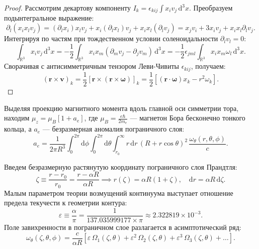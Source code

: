 \documentclass[11pt,a4paper]{article}
\theoremstyle{definition}
\theoremstyle{remark}
\begin{document}
\begin{proof}
Рассмотрим декартову компоненту $I_k = \epsilon_{kij} \int x_i v_j \, \mathrm{d}^3 x$. Преобразуем подынтегральное выражение:
\begin{equation}
    \partial_l (x_i x_l v_j) = (\partial_l x_i) x_l v_j + x_i (\partial_l x_l) v_j + x_i x_l (\partial_l v_j) = x_j v_i + 3 x_i v_j + x_i x_l \partial_l v_j.
\end{equation}
Интегрируя по частям при тождественном условии соленоидальности $\partial_l v_l = 0$:
\begin{equation}
    \int_{\mathbb{R}^3} x_i v_j \, \mathrm{d}^3 x = -\frac{1}{2} \int_{\mathbb{R}^3} x_i x_m (\partial_m v_j - \partial_j v_m) \, \mathrm{d}^3 x = -\frac{1}{2} \epsilon_{jml} \int_{\mathbb{R}^3} x_i x_m \omega_l \, \mathrm{d}^3 x.
\end{equation}
Сворачивая с антисимметричным тензором Леви-Чивиты $\epsilon_{kij}$, получаем:
\begin{equation}
    (\mathbf{r} \times \mathbf{v})_k = \frac{1}{2} \left[ \mathbf{r} \times (\mathbf{r} \times \boldsymbol{\omega}) \right]_k = \frac{1}{2} \left[ (\mathbf{r} \cdot \boldsymbol{\omega}) x_k - r^2 \omega_k \right].
\end{equation}
\end{proof}

Выделяя проекцию магнитного момента вдоль главной оси симметрии тора, находим $\mu_z = \mu_B [1 + a_e]$, где $\mu_B = \frac{e\hbar}{2m_e}$ --- магнетон Бора бесконечно тонкого кольца, а $a_e$ --- безразмерная аномалия пограничного слоя:
\begin{equation}
    a_e = \frac{1}{2\pi R^3} \int_0^{2\pi} \mathrm{d}\phi \int_0^{2\pi} \mathrm{d}\theta \int_{r_0}^\infty r \, \mathrm{d}r \, (R + r \cos\theta)^2 \, \frac{\omega_\theta(r, \theta, \phi)}{c}.
    \label{eq:master_anomaly_integral}
\end{equation}

Введем безразмерную растянутую координату пограничного слоя Прандтля:
\begin{equation}
    \zeta \equiv \frac{r - r_0}{r_0} = \frac{r - \alpha R}{\alpha R} \implies r(\zeta) = \alpha R(1 + \zeta), \quad \mathrm{d}r = \alpha R \, \mathrm{d}\zeta.
\end{equation}
Малым параметром теории возмущений континуума выступает отношение предела текучести к геометрии контура:
\begin{equation}
    \varepsilon \equiv \frac{\alpha}{\pi} = \frac{1}{137.035999177 \times \pi} \approx 2.322819 \times 10^{-3}.
\end{equation}
Поле завихренности в пограничном слое разлагается в асимптотический ряд:
\begin{equation}
    \omega_\theta(\zeta, \theta, \phi) = \frac{c}{\alpha R} \left[ \varepsilon \, \Omega_1(\zeta, \theta) + \varepsilon^2 \, \Omega_2(\zeta, \theta) + \varepsilon^3 \, \Omega_3(\zeta, \theta) + \dots \right].
    \label{eq:prandtl_series}
\end{equation}
\end{document}
